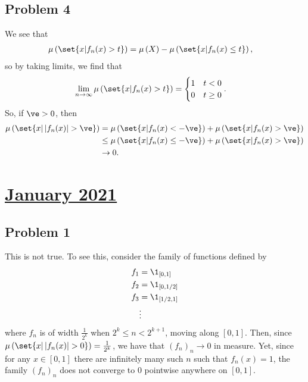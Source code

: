 \documentclass[10pt]{mypackage}
\begin{document}
\subsection{Problem 4}%
We see that
\begin{align*}
  \mu\left( \set{x | f_n(x) > t} \right) &= \mu\left( X \right) - \mu\left( \set{x | f_n(x) \leq t} \right),
\end{align*}
so by taking limits, we find that
\begin{align*}
  \lim_{n\rightarrow\infty} \mu\left( \set{x | f_n(x) > t} \right) &= \begin{cases}
    1 & t < 0\\
    0 & t\geq 0
  \end{cases}.
\end{align*}
So, if $\ve > 0$, then
\begin{align*}
  \mu\left( \set{x | \left\vert f_n(x) \right\vert > \ve} \right) &= \mu\left( \set{x | f_n(x) < -\ve} \right) + \mu\left( \set{x | f_n(x) > \ve} \right)\\
                                                                  &\leq \mu\left( \set{x | f_n(x)\leq -\ve} \right) + \mu\left( \set{x | f_n(x) > \ve} \right)\\
                                                                  &\rightarrow 0.
\end{align*}
\section{\href{https://math.virginia.edu/graduate/exams/analysis/2021Jan_real.pdf}{January 2021}}%
\subsection{Problem 1}%
This is not true. To see this, consider the family of functions defined by
\begin{align*}
  f_1 &= \1_{[0,1]}\\
  f_2 &= \1_{[0,1/2]}\\
  f_3 &= \1_{[1/2,1]}\\
      &\vdots
\end{align*}
where $f_n$ is of width $\frac{1}{2^{k}}$ when $2^{k} \leq n < 2^{k+1}$, moving along $[0,1]$. Then, since $\mu\left( \set{x | \left\vert f_n(x) \right\vert > 0} \right) = \frac{1}{2^{k}}$, we have that $\left( f_n \right)_n\rightarrow 0$ in measure. Yet, since for any $x\in [0,1]$ there are infinitely many such $n$ such that $f_n(x) = 1$, the family $\left( f_n \right)_n$ does not converge to $0$ pointwise anywhere on $[0,1]$.
\end{document}
